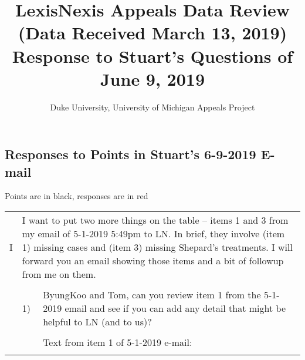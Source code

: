 \documentclass[10pt, letterpaper]{article}
\title{\large LexisNexis Appeals Data Review (Data Received March 13, 2019)\\[10pt]Response to Stuart's Questions of June 9, 2019\\[-6pt]}
\author{Duke University, University of Michigan Appeals Project}
\date{}
\begin{document}
    
\begin{spacing}{1.0}

\maketitle

\section{Responses to Points in Stuart's 6-9-2019 E-mail}

Points are in black, \color{red}responses are in red

\color{black}

\begin{longtable}{p{0.25in}p{0.25in}p{6in}}

    I & \multicolumn{2}{p{6.25in}}{I want to put two more things on the table – items 1 and 3 from my email of 5-1-2019 5:49pm to LN. In brief, they involve (item 1) missing cases and (item 3) missing Shepard’s treatments. I will forward you an email showing those items and a bit of followup from me on them.}\\\\
    
    & 1) & ByungKoo and Tom, can you review item 1 from the 5-1-2019 email and see if you can add any detail that might be helpful to LN (and to us)?\\\\
    
    & & Text from item 1 of 5-1-2019 e-mail:\\\\
    

\end{longtable}
\end{spacing}
\end{document}
